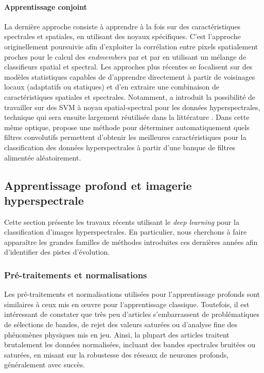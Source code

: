 \paragraph{Apprentissage conjoint} La dernière approche consiste à apprendre à la fois sur des caractéristiques spectrales et spatiales, en utilisant des noyaux spécifiques. C'est l'approche originellement poursuivie afin d'exploiter la corrélation entre pixels spatialement proches pour le calcul des \textit{endmembers}  par \cite{plaza_spatial/spectral_2002} et par \cite{dellacqua_exploiting_2004} en utilisant un mélange de classifieurs spatial et spectral. Les approches plus récentes se focalisent sur des modèles statistiques capables de d'apprendre directement à partir de voisinages locaux (adaptatifs ou statiques) et d'en extraire une combinaison de caractéristiques spatiales et spectrales. Notamment, \cite{camps-valls_composite_2006} a introduit la possibilité de travailler sur des SVM à noyau spatial-spectral pour les données hyperspectrales, technique qui sera ensuite largement réutilisée dans la littérature \cite{tarabalka_spectralspatial_2009,fauvel_spatial-spectral_2012}. Dans cette même optique, \cite{tuia_multiclass_2015} propose une méthode pour déterminer automatiquement quels filtres convolutifs permettent d'obtenir les meilleures caractéristiques pour la classification des données hyperspectrales à partir d'une banque de filtres alimentée aléatoirement.

\subsection{Apprentissage profond et imagerie hyperspectrale}

Cette section présente les travaux récents utilisant le \textit{deep learning} pour la classification d'images hyperspectrales. En particulier, nous cherchons à faire apparaître les grandes familles de méthodes introduites ces dernières années afin d'identifier des pistes d'évolution.

\subsubsection{Pré-traitements et normalisations}

Les pré-traitements et normalisations utilisées pour l'apprentissage profonds sont similaires à ceux mis en \oe{}uvre pour l'apprentissage classique. Toutefois, il est intéressant de constater que très peu d'articles s'embarrassent de problématiques de sélections de bandes, de rejet des valeurs saturées ou d'analyse fine des phénomènes physiques mis en jeu. Ainsi, la plupart des articles traitent brutalement les données normalisées, incluant des bandes spectrales bruitées ou saturées, en misant sur la robustesse des réseaux de neurones profonds, généralement avec succès.

